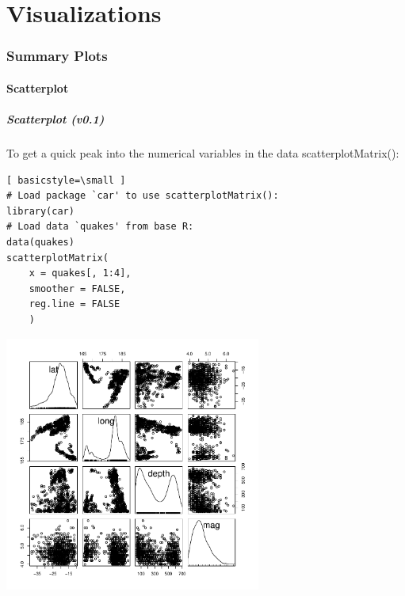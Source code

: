 \part{Visualizations}


\section[Summary Plots]{Summary Plots}

\subsection{Scatterplot}
\begin{frame}
\frametitle{Scatterplot (v0.1)}

To get a quick peak into the numerical variables in the data \ttfamily scatterplotMatrix(): \normalfont
  		\begin{lstlisting}[ basicstyle=\small ]
# Load package `car' to use scatterplotMatrix():	
library(car)	
# Load data `quakes' from base R:
data(quakes)
scatterplotMatrix(
	x = quakes[, 1:4], 
	smoother = FALSE, 
	reg.line = FALSE
	)
		\end{lstlisting}

        \begin{center}
         \includegraphics[width=0.63\textwidth]{images/scatterPlot_v0.pdf}
        \end{center}
\end{frame}

